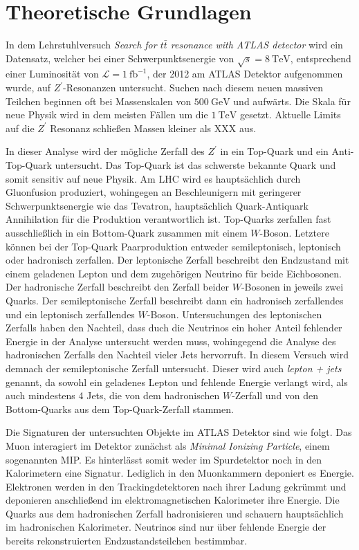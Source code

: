 \section{Theoretische Grundlagen}

In dem Lehrstuhlversuch \textit{Search for $t\bar{t}$ resonance with ATLAS detector} wird ein Datensatz, welcher bei
einer Schwerpunktsenergie von $\sqrt{s} = \SI{8}{\tera\electronvolt}$, entsprechend einer Luminosität von
$\mathcal{L} = \SI{1}{\femto\barn}^{-1}$, der 2012 am ATLAS Detektor aufgenommen wurde, auf $Z^\prime$-Resonanzen untersucht.
Suchen nach diesem neuen massiven Teilchen beginnen oft bei Massenskalen von $\SI{500}{\giga\electronvolt}$ und aufwärts. Die
Skala für neue Physik wird in dem meisten Fällen um die $\SI{1}{\tera\electronvolt}$ gesetzt. Aktuelle Limits auf die
$Z^\prime$ Resonanz schließen Massen kleiner als XXX aus. \par

In dieser Analyse wird der mögliche Zerfall des $Z^\prime$ in ein Top-Quark und ein Anti-Top-Quark untersucht. Das Top-Quark
ist das schwerste bekannte Quark und somit sensitiv auf neue Physik. Am LHC wird es hauptsächlich durch Gluonfusion
produziert, wohingegen an Beschleunigern mit geringerer Schwerpunktsenergie wie das Tevatron, hauptsächlich Quark-Antiquark
Annihilation für die Produktion verantwortlich ist. Top-Quarks
zerfallen fast ausschließlich in ein Bottom-Quark zusammen mit einem $W$-Boson. Letztere können bei der
Top-Quark Paarproduktion entweder semileptonisch,
leptonisch oder hadronisch zerfallen. Der leptonische Zerfall beschreibt den Endzustand mit einem geladenen Lepton und
dem zugehörigen Neutrino für beide Eichbosonen. Der hadronische Zerfall beschreibt den Zerfall beider $W$-Bosonen in
jeweils zwei Quarks. Der semileptonische Zerfall beschreibt dann ein hadronisch zerfallendes und ein leptonisch
zerfallendes  $W$-Boson. Untersuchungen des leptonischen Zerfalls haben den Nachteil, dass duch die Neutrinos ein hoher Anteil fehlender
Energie in der Analyse untersucht werden muss, wohingegend die Analyse des hadronischen Zerfalls den Nachteil vieler Jets
hervorruft.
In diesem Versuch wird demnach der semileptonische Zerfall untersucht.
Dieser wird auch \textit{lepton + jets} genannt,
da sowohl ein geladenes Lepton und fehlende Energie verlangt wird, als auch mindestens 4 Jets, die von dem hadronischen $W$-Zerfall und von den Bottom-Quarks
aus dem Top-Quark-Zerfall stammen. \par

Die Signaturen der untersuchten Objekte im ATLAS Detektor sind wie folgt. Das Muon interagiert im Detektor zunächst als \textit{Minimal Ionizing Particle},
einem sogenannten MIP. Es hinterlässt somit weder im Spurdetektor noch in den Kalorimetern eine Signatur. Lediglich in den Muonkammern deponiert es
Energie. Elektronen werden in den Trackingdetektoren nach ihrer Ladung gekrümmt und deponieren anschließend im elektromagnetischen Kalorimeter ihre
Energie. Die Quarks aus dem hadronischen Zerfall hadronisieren und schauern hauptsächlich im hadronischen Kalorimeter. Neutrinos sind nur über fehlende
Energie der bereits rekonstruierten Endzustandsteilchen bestimmbar.

